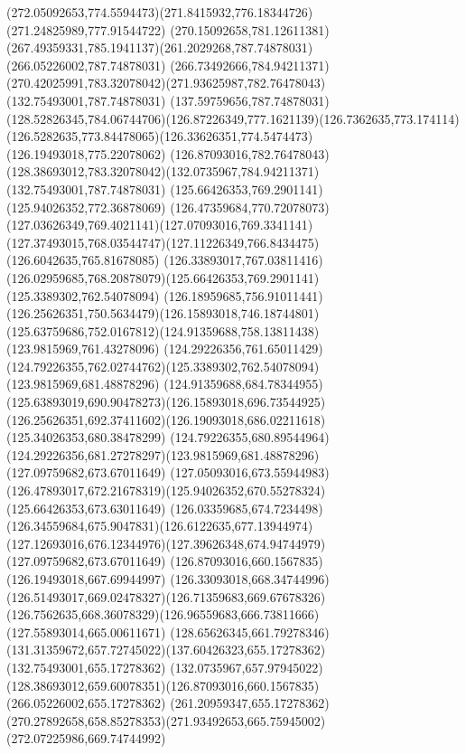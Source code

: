 {{		\curveto(272.05092653,774.5594473)(271.8415932,776.18344726)(271.24825989,777.91544722)
		\curveto(270.15092658,781.12611381)(267.49359331,785.1941137)(261.2029268,787.74878031)
		\lineto(266.05226002,787.74878031)
		\curveto(266.73492666,784.94211371)(270.42025991,783.32078042)(271.93625987,782.76478043)
		\moveto(132.75493001,787.74878031)
		\lineto(137.59759656,787.74878031)
		\curveto(128.52826345,784.06744706)(126.87226349,777.1621139)(126.7362635,773.174114)
		\curveto(126.5282635,773.84478065)(126.33626351,774.5474473)(126.19493018,775.22078062)
		\lineto(126.87093016,782.76478043)
		\curveto(128.38693012,783.32078042)(132.0735967,784.94211371)(132.75493001,787.74878031)
		\moveto(125.66426353,769.2901141)
		\lineto(125.94026352,772.36878069)
		\curveto(126.47359684,770.72078073)(127.03626349,769.4021141)(127.07093016,769.3341141)
		\curveto(127.37493015,768.03544747)(127.11226349,766.8434475)(126.6042635,765.81678085)
		\curveto(126.33893017,767.03811416)(126.02959685,768.20878079)(125.66426353,769.2901141)
		\moveto(125.3389302,762.54078094)
		\curveto(126.18959685,756.91011441)(126.25626351,750.5634479)(126.15893018,746.18744801)
		\curveto(125.63759686,752.0167812)(124.91359688,758.13811438)(123.9815969,761.43278096)
		\curveto(124.29226356,761.65011429)(124.79226355,762.02744762)(125.3389302,762.54078094)
		\moveto(123.9815969,681.48878296)
		\curveto(124.91359688,684.78344955)(125.63893019,690.90478273)(126.15893018,696.73544925)
		\curveto(126.25626351,692.37411602)(126.19093018,686.02211618)(125.34026353,680.38478299)
		\curveto(124.79226355,680.89544964)(124.29226356,681.27278297)(123.9815969,681.48878296)
		\moveto(127.09759682,673.67011649)
		\curveto(127.05093016,673.55944983)(126.47893017,672.21678319)(125.94026352,670.55278324)
		\lineto(125.66426353,673.63011649)
		\curveto(126.03359685,674.7234498)(126.34559684,675.9047831)(126.6122635,677.13944974)
		\curveto(127.12693016,676.12344976)(127.39626348,674.94744979)(127.09759682,673.67011649)
		\moveto(126.87093016,660.1567835)
		\lineto(126.19493018,667.69944997)
		\curveto(126.33093018,668.34744996)(126.51493017,669.02478327)(126.71359683,669.67678326)
		\curveto(126.7562635,668.36078329)(126.96559683,666.73811666)(127.55893014,665.00611671)
		\curveto(128.65626345,661.79278346)(131.31359672,657.72745022)(137.60426323,655.17278362)
		\lineto(132.75493001,655.17278362)
		\curveto(132.0735967,657.97945022)(128.38693012,659.60078351)(126.87093016,660.1567835)
		\moveto(266.05226002,655.17278362)
		\lineto(261.20959347,655.17278362)
		\curveto(270.27892658,658.85278353)(271.93492653,665.75945002)(272.07225986,669.74744992)
}}

